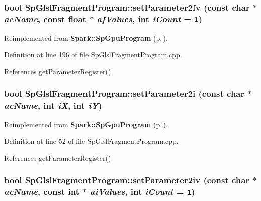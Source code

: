 \subsubsection{\setlength{\rightskip}{0pt plus 5cm}bool Sp\-Glsl\-Fragment\-Program::set\-Parameter2fv (const char $\ast$ {\em ac\-Name}, const float $\ast$ {\em af\-Values}, int {\em i\-Count} = {\tt 1})\hspace{0.3cm}{\tt  [virtual]}}\label{classSpark_1_1SpGlslFragmentProgram_a14}




Reimplemented from {\bf Spark::Sp\-Gpu\-Program} {\rm (p.\,\pageref{classSpark_1_1SpGpuProgram_a25})}.

Definition at line 196 of file Sp\-Glsl\-Fragment\-Program.cpp.

References get\-Parameter\-Register().
\subsubsection{\setlength{\rightskip}{0pt plus 5cm}bool Sp\-Glsl\-Fragment\-Program::set\-Parameter2i (const char $\ast$ {\em ac\-Name}, int {\em i\-X}, int {\em i\-Y})\hspace{0.3cm}{\tt  [virtual]}}\label{classSpark_1_1SpGlslFragmentProgram_a2}




Reimplemented from {\bf Spark::Sp\-Gpu\-Program} {\rm (p.\,\pageref{classSpark_1_1SpGpuProgram_a13})}.

Definition at line 52 of file Sp\-Glsl\-Fragment\-Program.cpp.

References get\-Parameter\-Register().
\subsubsection{\setlength{\rightskip}{0pt plus 5cm}bool Sp\-Glsl\-Fragment\-Program::set\-Parameter2iv (const char $\ast$ {\em ac\-Name}, const int $\ast$ {\em ai\-Values}, int {\em i\-Count} = {\tt 1})\hspace{0.3cm}{\tt  [virtual]}}\label{classSpark_1_1SpGlslFragmentProgram_a6}


